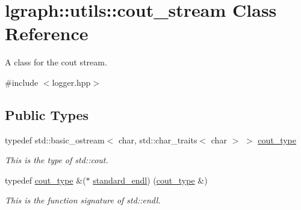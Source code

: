 \hypertarget{classlgraph_1_1utils_1_1cout__stream}{}\section{lgraph\+:\+:utils\+:\+:cout\+\_\+stream Class Reference}
\label{classlgraph_1_1utils_1_1cout__stream}


A class for the cout stream.  




{\ttfamily \#include $<$logger.\+hpp$>$}

\subsection*{Public Types}
\begin{DoxyCompactItemize}
\item 
typedef std\+::basic\+\_\+ostream$<$ char, std\+::char\+\_\+traits$<$ char $>$ $>$ \hyperlink{classlgraph_1_1utils_1_1cout__stream_a567e84e8f695f9f06e25a90385bd36bc}{cout\+\_\+type}\hypertarget{classlgraph_1_1utils_1_1cout__stream_a567e84e8f695f9f06e25a90385bd36bc}{}\label{classlgraph_1_1utils_1_1cout__stream_a567e84e8f695f9f06e25a90385bd36bc}

\begin{DoxyCompactList}\small\item\em This is the type of std\+::cout. \end{DoxyCompactList}\item 
typedef \hyperlink{classlgraph_1_1utils_1_1cout__stream_a567e84e8f695f9f06e25a90385bd36bc}{cout\+\_\+type} \&($\ast$ \hyperlink{classlgraph_1_1utils_1_1cout__stream_a3dc3129e1e5c26c370223e29dbdefe75}{standard\+\_\+endl}) (\hyperlink{classlgraph_1_1utils_1_1cout__stream_a567e84e8f695f9f06e25a90385bd36bc}{cout\+\_\+type} \&)\hypertarget{classlgraph_1_1utils_1_1cout__stream_a3dc3129e1e5c26c370223e29dbdefe75}{}\label{classlgraph_1_1utils_1_1cout__stream_a3dc3129e1e5c26c370223e29dbdefe75}

\begin{DoxyCompactList}\small\item\em This is the function signature of std\+::endl. \end{DoxyCompactList}\end{DoxyCompactItemize}
